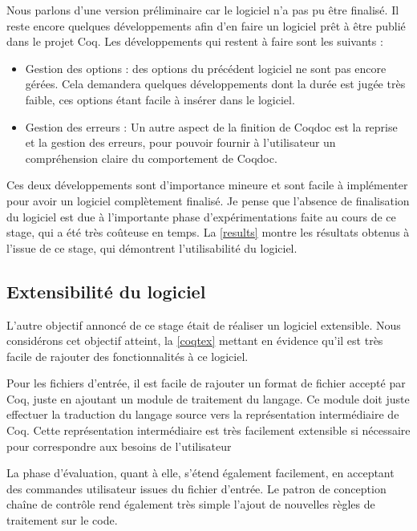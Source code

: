 \documentclass[a4paper, 11pt]{report}
\begin{document}
    Nous parlons d'une version préliminaire car le logiciel n'a pas pu être
    finalisé. Il reste encore quelques développements afin d'en faire un logiciel
    prêt à être publié dans le projet Coq. Les développements qui restent à faire
    sont les suivants :
    \begin{itemize}
      \item Gestion des options : des options du précédent logiciel ne
        sont pas encore gérées. Cela demandera quelques développements dont la
        durée est jugée très faible, ces options étant facile à insérer dans
        le logiciel.
      \item Gestion des erreurs : Un autre aspect de la finition de Coqdoc
        est la reprise et la gestion des erreurs, pour pouvoir fournir à
        l'utilisateur un compréhension claire du comportement de Coqdoc.
    \end{itemize}

    Ces deux développements sont d'importance mineure et sont facile à
    implémenter pour avoir un logiciel complètement finalisé.
    Je pense que l'absence de finalisation du logiciel est due à l'importante
    phase d'expérimentations faite au cours de ce stage, qui a été très
    coûteuse en temps. La \cref{results} montre les résultats obtenus à l'issue
    de ce stage, qui démontrent l'utilisabilité du logiciel.

    \subsection{Extensibilité du logiciel}
    L'autre objectif annoncé de ce stage était de réaliser un logiciel
    extensible. Nous considérons cet objectif atteint, la \cref{coqtex} mettant
    en évidence qu'il est très facile de rajouter des fonctionnalités à ce
    logiciel.

    Pour les fichiers d'entrée, il est facile de rajouter un format de fichier
    accepté par Coq, juste en ajoutant un module de traitement du langage. Ce
    module doit juste effectuer la traduction du langage source vers la
    représentation intermédiaire de Coq. Cette représentation intermédiaire est
    très facilement extensible si nécessaire pour correspondre aux besoins de
    l'utilisateur

    La phase d'évaluation, quant à elle, s'étend également facilement, en
    acceptant des commandes utilisateur issues du fichier d'entrée. Le patron
    de conception chaîne de contrôle rend également très simple l'ajout de
    nouvelles règles de traitement sur le code.
\end{document}

